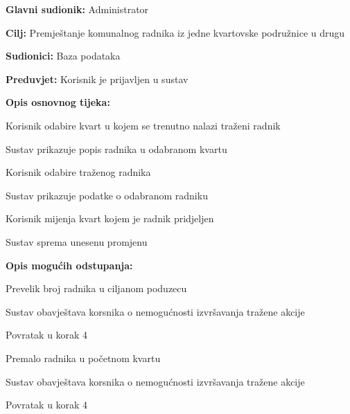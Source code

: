 	\noindent {}
					\begin{packed_item}
	
						\item \textbf{Glavni sudionik: }Administrator
						\item  \textbf{Cilj:} Premještanje komunalnog radnika iz jedne kvartovske podružnice u drugu
						\item  \textbf{Sudionici:} Baza podataka
						\item  \textbf{Preduvjet:} Korisnik je prijavljen u sustav
						\item  \textbf{Opis osnovnog tijeka:}
						
						\item[] \begin{packed_enum}
	
							\item Korisnik odabire kvart u kojem se trenutno nalazi traženi radnik
							\item Sustav prikazuje popis radnika u odabranom kvartu
							\item Korisnik odabire traženog radnika 
							\item Sustav prikazuje podatke o odabranom radniku
							\item Korisnik mijenja kvart kojem je radnik pridjeljen
							\item Sustav sprema unesenu promjenu
						\end{packed_enum}
						
						\item  \textbf{Opis mogućih odstupanja:}
						
						\item[] \begin{packed_item}
	
							\item[5.a] Prevelik broj radnika u ciljanom poduzecu
							
							\item[] \begin{packed_enum}
								
								\item Sustav obavještava korsnika o nemogućnosti izvršavanja tražene akcije
								\item Povratak u korak 4
								
							\end{packed_enum}
							\item[5.b] Premalo radnika u početnom kvartu
							
								\item[] \begin{packed_enum}
								
								\item Sustav obavještava korsnika o nemogućnosti izvršavanja tražene akcije
								\item Povratak u korak 4
								
							\end{packed_enum}
							
						\end{packed_item}
					\end{packed_item}

